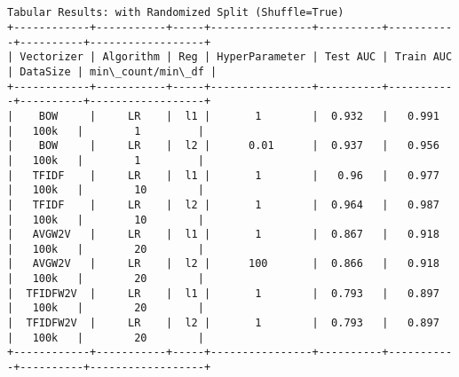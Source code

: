 \documentclass[11pt]{article}
\begin{document}
    \begin{Verbatim}[commandchars=\\\{\}]


Tabular Results: with Randomized Split (Shuffle=True)
+------------+-----------+-----+----------------+----------+-----------+----------+------------------+
| Vectorizer | Algorithm | Reg | HyperParameter | Test AUC | Train AUC | DataSize | min\_count/min\_df |
+------------+-----------+-----+----------------+----------+-----------+----------+------------------+
|    BOW     |     LR    |  l1 |       1        |  0.932   |   0.991   |   100k   |        1         |
|    BOW     |     LR    |  l2 |      0.01      |  0.937   |   0.956   |   100k   |        1         |
|   TFIDF    |     LR    |  l1 |       1        |   0.96   |   0.977   |   100k   |        10        |
|   TFIDF    |     LR    |  l2 |       1        |  0.964   |   0.987   |   100k   |        10        |
|   AVGW2V   |     LR    |  l1 |       1        |  0.867   |   0.918   |   100k   |        20        |
|   AVGW2V   |     LR    |  l2 |      100       |  0.866   |   0.918   |   100k   |        20        |
|  TFIDFW2V  |     LR    |  l1 |       1        |  0.793   |   0.897   |   100k   |        20        |
|  TFIDFW2V  |     LR    |  l2 |       1        |  0.793   |   0.897   |   100k   |        20        |
+------------+-----------+-----+----------------+----------+-----------+----------+------------------+

    \end{Verbatim}
\end{document}

